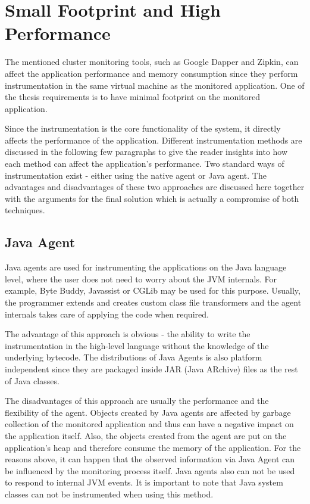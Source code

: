 \section{Small Footprint and High Performance}
The mentioned cluster monitoring tools, such as Google Dapper and Zipkin, can affect the application performance and memory consumption since they perform instrumentation in the same virtual machine as the monitored application. One of the thesis requirements is to have minimal footprint on the monitored application.

Since the instrumentation is the core functionality of the system, it directly affects the performance of the application. Different instrumentation methods are discussed in the following few paragraphs to give the reader insights into how each method can affect the application's performance. Two standard ways of instrumentation exist - either using the native agent or Java agent. The advantages and disadvantages of these two approaches are discussed here together with the arguments for the final solution which is actually a compromise of both techniques.
\subsection{Java Agent}
\label{java_agent}
Java agents are used for instrumenting the applications on the Java language level, where the user does not need to worry about the JVM internals. For example, Byte Buddy, Javassist or CGLib may be used for this purpose. Usually, the programmer extends and creates custom class file transformers and the agent internals takes care of applying the code when required. 

The advantage of this approach is obvious - the ability to write the instrumentation in the high-level language without the knowledge of the underlying bytecode. The distributions of Java Agents is also platform independent since they are packaged inside JAR (Java ARchive) files as the rest of Java classes. 

The disadvantages of this approach are usually the performance and the flexibility of the agent. Objects created by Java agents are affected by garbage collection of the monitored application and thus can have a negative impact on the application itself. Also, the objects created from the agent are put on the application's heap and therefore consume the memory of the application. For the reasons above, it can happen that the observed information via Java Agent can be influenced by the monitoring process itself. Java agents also can not be used to respond to internal JVM events. It is important to note that Java system classes can not be instrumented when using this method.
